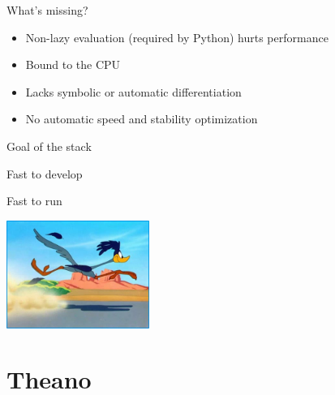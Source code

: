 \documentclass[utf8x,xcolor=pdftex,dvipsnames,table]{beamer}
\begin{document}
\begin{frame}{What's missing?}
  \begin{itemize}
    \item Non-lazy evaluation (required by Python) hurts performance
    \item Bound to the CPU
    \item Lacks symbolic or automatic differentiation
    \item No automatic speed and stability optimization
  \end{itemize}

\end{frame}

\begin{frame}{Goal of the stack}
\begin{center}
\begin{bf}Fast to develop\end{bf}\newline \bigskip
\begin{bf}Fast to run\end{bf}\newline \bigskip
\hspace{-2.5cm}
\includegraphics[width=0.35\textwidth]{../omlw2014/road-runner-1.jpg}
\end{center}
\end{frame}


\section{Theano}
\begin{frame}
  \tableofcontents[currentsection]
\end{frame}
\end{document}

